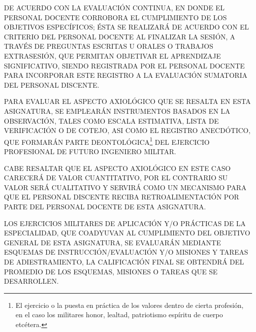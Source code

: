 \documentclass{myarticle}
\begin{document}
\begin{description}
DE ACUERDO CON LA EVALUACIÓN CONTINUA, EN DONDE EL PERSONAL DOCENTE 
CORROBORA EL CUMPLIMIENTO DE LOS OBJETIVOS ESPECÍFICOS; ÉSTA SE REALIZARÁ 
DE ACUERDO CON EL CRITERIO DEL PERSONAL DOCENTE AL FINALIZAR LA SESIÓN, 
A TRAVÉS DE PREGUNTAS ESCRITAS U ORALES O TRABAJOS EXTRASESIÓN, QUE PERMITAN 
OBJETIVAR EL APRENDIZAJE SIGNIFICATIVO, SIENDO REGISTRADA POR EL PERSONAL 
DOCENTE PARA INCORPORAR ESTE REGISTRO A LA E\-VA\-LUA\-CIÓN SUMATORIA DEL 
PERSONAL DISCENTE.


PARA EVALUAR EL ASPECTO AXIOLÓGICO QUE SE RESALTA EN ESTA ASIGNATURA, SE 
EMPLEARÁN INSTRUMENTOS BASADOS EN LA OBSERVACIÓN, TALES COMO ESCALA 
ESTIMATIVA, LISTA DE VERIFICACIÓN O DE COTEJO, ASI COMO EL RE\-GIS\-TRO 
ANECDÓTICO, QUE FORMARÁN PARTE DEONTOLÓGICA\footnote{El ejercicio o la 
puesta en práctica de los valores dentro de cierta profesión, en el caso 
los militares honor, lealtad, patriotismo espíritu de cuerpo etcétera.} 
DEL EJERCICIO PROFESIONAL DE FUTURO INGENIERO MILITAR.

CABE RESALTAR QUE EL ASPECTO AXIOLÓGICO EN ESTE CASO CARECERÁ DE VALOR 
CUANTITATIVO, POR EL CONTRARIO SU VALOR SERÁ CUALITATIVO Y SERVIRÁ COMO 
UN ME\-CA\-NIS\-MO PARA QUE EL PERSONAL DISCENTE RECIBA RETROALIMENTACIÓN 
POR PARTE DEL PERSONAL DOCENTE DE ESTA ASIGNATURA.

LOS EJERCICIOS MILITARES DE APLICACIÓN Y/O PRÁCTICAS DE LA ESPECIALIDAD, 
QUE COADYUVAN AL CUMPLIMIENTO DEL OBJETIVO GENERAL DE ESTA ASIGNATURA, 
SE EVALUARÁN MEDIANTE ESQUEMAS DE INSTRUCCIÓN/EVALUACIÓN Y/O MISIONES Y 
TAREAS DE ADIESTRAMIENTO, LA CALIFICACIÓN FINAL SE OBTENDRÁ DEL PROMEDIO 
DE LOS ESQUEMAS, MISIONES O TAREAS QUE SE DESARROLLEN.


\end{description}
\end{document}
